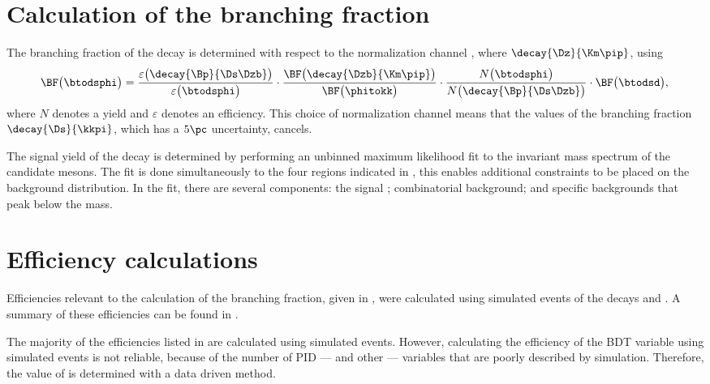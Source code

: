 \section{Calculation of the branching fraction}
\label{sec:dsphi:bf}
The branching fraction of the decay \btodsphi is determined with respect to the normalization
channel \btodsd, where $\decay{\Dz}{\Km\pip}$, using
\begin{equation}
  \BF\big(\btodsphi\big) =
  \frac{\varepsilon\big(\decay{\Bp}{\Ds\Dzb}\big)}{\varepsilon\big(\btodsphi\big)}
  \cdot
  \frac{\BF\big(\decay{\Dzb}{\Km\pip}\big)}{\BF\big(\phitokk\big)}
  \cdot
  \frac{N\big(\btodsphi\big)}{N\big(\decay{\Bp}{\Ds\Dzb}\big)}
  \cdot
  \BF\big(\btodsd\big)
  , \\
  \label{eq:dsphi:bf}
\end{equation}
where $N$ denotes a yield and $\varepsilon$ denotes an efficiency.
This choice of normalization channel means that the values of the branching fraction
$\decay{\Ds}{\kkpi}$, which has a $5\pc$ uncertainty, cancels.




The signal yield of the decay \btodsphi is determined by performing an unbinned maximum likelihood
fit to the invariant mass spectrum of the candidate \Bp mesons.
The fit is done simultaneously to the four regions indicated in , this enables
additional constraints to be placed on the background distribution.
In the fit, there are several components: the signal \btodsphi; combinatorial background; and
specific backgrounds that peak below the \Bp mass.


\section{Efficiency calculations}
Efficiencies relevant to the calculation of the
branching fraction, given in , were
calculated using simulated events of the decays \btodsphi and \btodsd.
A summary of these efficiencies can be found in .

The majority of the efficiencies listed in  are calculated using simulated
\btodsphi events.
However, calculating the efficiency of the BDT variable using simulated events is not reliable,
because of the number of PID --- and other --- variables that are poorly described by simulation.
Therefore, the value of  is determined with a data driven method.

